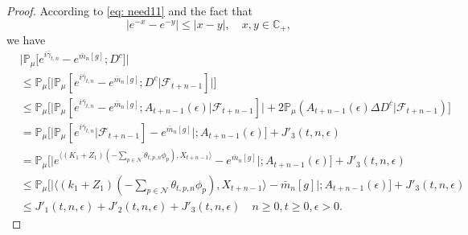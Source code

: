 \documentclass[12pt,a4paper]{amsart}
\theoremstyle{plain}
\theoremstyle{definition}
\numberwithin{equation}{section}
\begin{document}
\begin{proof}
 According to \eqref{eq: need11} and the fact that
\[
	|e^{-x} - e^{-y}| \leq |x-y|,\quad x,y \in \mathbb C_+,
\]
we have
\begin{align}
\label{eq: inequality that will used later1}
    &\big|\mathbb{P}_{\mu}\big[e^{i\bar{\gamma}_{t,n}}-e^{\bar{m}_n[g]}; D^c\big]\big|
    \\& \leq \mathbb{P}_{\mu}\Big[\big| \mathbb{P}_{\mu}[e^{i\bar{\gamma}_{t,n}}-e^{\bar{m}_n[g]}; D^c | \mathscr F_{t+n-1}]\big|\Big]
    \\& \leq \mathbb{P}_{\mu}\Big[\big| \mathbb{P}_{\mu}[e^{i\bar{\gamma}_{t,n}}-e^{\bar{m}_n[g]}; A_{t+n-1}(\epsilon)| \mathscr F_{t+n-1}]\big| + 2\mathbb P_\mu(A_{t+n-1}(\epsilon) \Delta D^c| \mathscr F_{t+n-1})\Big]
    \\& = \mathbb{P}_{\mu}\Big[ \big|\mathbb{P}_{\mu}[e^{i\bar{\gamma}_{t,n}}| \mathscr F_{t+n-1}]-e^{\bar{m}_n[g]}\big|;A_{t+n-1}(\epsilon)\Big] + J'_3(t,n,\epsilon)
    \\&=\mathbb{P}_{\mu}\Big[\big|e^{\langle (K_1+Z_1)(-\sum_{p\in \mathcal{N}}\theta_{t,p,n}\phi_p), X_{t+n-1}\rangle}-e^{\bar{m}_n[g]}\big|;A_{t+n-1}(\epsilon)\Big]+ J'_3(t,n,\epsilon)
    \\&\leq \mathbb{P}_{\mu}\Big[\big|\langle (k_1+Z_1)(-\sum_{p\in \mathcal{N}}\theta_{t,p,n}\phi_p), X_{t+n-1}\rangle-\bar{m}_n[g]\big|;A_{t+n-1}(\epsilon)\Big]+ J'_3(t,n,\epsilon)
    \\&\leq J'_1(t,n,\epsilon)+J'_2(t,n,\epsilon)+J'_3(t,n,\epsilon)
    \quad n\geq 0, t\geq 0, \epsilon> 0.
\end{align}


\end{proof}
\end{document}
